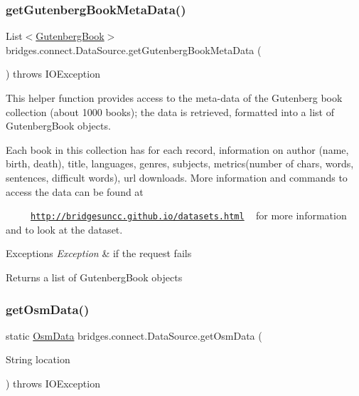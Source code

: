 \subsubsection{\texorpdfstring{get\+Gutenberg\+Book\+Meta\+Data()}{getGutenbergBookMetaData()}}
{\footnotesize\ttfamily List$<$\hyperlink{classbridges_1_1data__src__dependent_1_1_gutenberg_book}{Gutenberg\+Book}$>$ bridges.\+connect.\+Data\+Source.\+get\+Gutenberg\+Book\+Meta\+Data (\begin{DoxyParamCaption}{ }\end{DoxyParamCaption}) throws I\+O\+Exception}

This helper function provides access to the meta-\/data of the Gutenberg book collection (about 1000 books); the data is retrieved, formatted into a list of Gutenberg\+Book objects.

Each book in this collection has for each record, information on author (name, birth, death), title, languages, genres, subjects, metrics(number of chars, words, sentences, difficult words), url downloads. More information and commands to access the data can be found at 

~~~~~\href{http://bridgesuncc.github.io/datasets.html}{\tt http\+://bridgesuncc.\+github.\+io/datasets.\+html} ~\newline
 for more information and to look at the dataset.


\begin{DoxyExceptions}{Exceptions}
{\em Exception} & if the request fails\\
\hline
\end{DoxyExceptions}
\begin{DoxyReturn}{Returns}
a list of Gutenberg\+Book objects 
\end{DoxyReturn}
\mbox{\label{classbridges_1_1connect_1_1_data_source_a836aff0a3c4003cbc21d65d949d5f985}} 
\subsubsection{\texorpdfstring{get\+Osm\+Data()}{getOsmData()}\hspace{0.1cm}{\footnotesize\ttfamily [1/4]}}
{\footnotesize\ttfamily static \hyperlink{classbridges_1_1data__src__dependent_1_1_osm_data}{Osm\+Data} bridges.\+connect.\+Data\+Source.\+get\+Osm\+Data (\begin{DoxyParamCaption}\item[{String}]{location }\end{DoxyParamCaption}) throws I\+O\+Exception\hspace{0.3cm}{\ttfamily [static]}}

